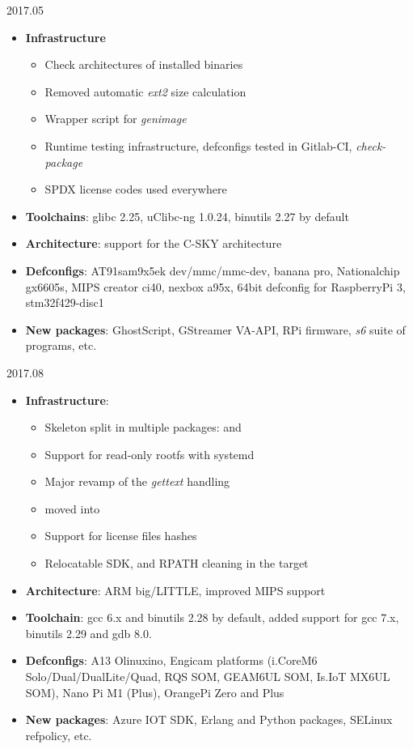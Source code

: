 \begin{frame}{2017.05}
  \begin{itemize}
  \item {\bf Infrastructure}
    \begin{itemize}
    \item Check architectures of installed binaries
    \item Removed automatic {\em ext2} size calculation
    \item Wrapper script for {\em genimage}
    \item Runtime testing infrastructure, defconfigs tested in
      Gitlab-CI, {\em check-package}
    \item SPDX license codes used everywhere
    \end{itemize}
  \item {\bf Toolchains}: glibc 2.25, uClibc-ng 1.0.24, binutils 2.27
    by default
  \item {\bf Architecture}: support for the C-SKY architecture
  \item {\bf Defconfigs}: AT91sam9x5ek dev/mmc/mmc-dev, banana pro,
    Nationalchip gx6605s, MIPS creator ci40, nexbox a95x, 64bit
    defconfig for RaspberryPi 3, stm32f429-disc1
  \item {\bf New packages}: GhostScript, GStreamer VA-API, RPi
    firmware, {\em s6} suite of programs, etc.
  \end{itemize}
\end{frame}

\begin{frame}{2017.08}
  \begin{itemize}
  \item {\bf Infrastructure}:
    \begin{itemize}
    \item Skeleton split in multiple packages:
       and
    \item Support for read-only rootfs with systemd
    \item Major revamp of the {\em gettext} handling
    \item {} moved into 
    \item Support for license files hashes
    \item Relocatable SDK, and RPATH cleaning in the target
    \end{itemize}
  \item {\bf Architecture}: ARM big/LITTLE, improved MIPS support
  \item {\bf Toolchain}: gcc 6.x and binutils 2.28 by default, added
    support for gcc 7.x, binutils 2.29 and gdb 8.0.
  \item {\bf Defconfigs}: A13 Olinuxino, Engicam platforms (i.CoreM6
    Solo/Dual/DualLite/Quad, RQS SOM, GEAM6UL SOM, Is.IoT MX6UL
    SOM), Nano Pi M1 (Plus), OrangePi Zero and Plus
  \item {\bf New packages}: Azure IOT SDK, Erlang and Python packages,
    SELinux refpolicy, etc.
  \end{itemize}
\end{frame}

